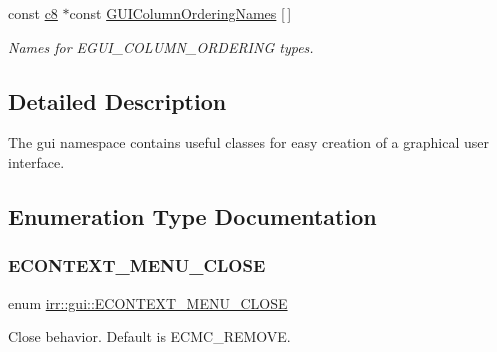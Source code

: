 \begin{DoxyCompactItemize}
\mbox{\label{namespaceirr_1_1gui_aeb6928fac43f31873c0d707afafa9f47}} 
const \hyperlink{namespaceirr_a9395eaea339bcb546b319e9c96bf7410}{c8} $\ast$const \hyperlink{namespaceirr_1_1gui_aeb6928fac43f31873c0d707afafa9f47}{G\+U\+I\+Column\+Ordering\+Names} \mbox{[}$\,$\mbox{]}
\begin{DoxyCompactList}\small\item\em Names for E\+G\+U\+I\+\_\+\+C\+O\+L\+U\+M\+N\+\_\+\+O\+R\+D\+E\+R\+I\+NG types. \end{DoxyCompactList}\end{DoxyCompactItemize}


\subsection{Detailed Description}
The gui namespace contains useful classes for easy creation of a graphical user interface. 

\subsection{Enumeration Type Documentation}
\mbox{\label{namespaceirr_1_1gui_a0868ffd1ff3d3fc1e2db2fcd118e320d}} 
\subsubsection{\texorpdfstring{E\+C\+O\+N\+T\+E\+X\+T\+\_\+\+M\+E\+N\+U\+\_\+\+C\+L\+O\+SE}{ECONTEXT\_MENU\_CLOSE}}
{\footnotesize\ttfamily enum \hyperlink{namespaceirr_1_1gui_a0868ffd1ff3d3fc1e2db2fcd118e320d}{irr\+::gui\+::\+E\+C\+O\+N\+T\+E\+X\+T\+\_\+\+M\+E\+N\+U\+\_\+\+C\+L\+O\+SE}}



Close behavior. Default is E\+C\+M\+C\+\_\+\+R\+E\+M\+O\+VE. 

